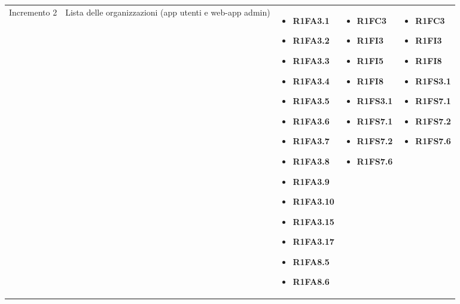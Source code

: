 {\begin{longtable}{C{2.5cm} C{3.2cm} C{2.8cm} C{2.8cm} C{2.8cm}}
Incremento 2 & Lista delle organizzazioni (app utenti e web-app admin) & \begin{itemize}
    \item[ ] \textbf{R1FA3.1}
    \item[ ] \textbf{R1FA3.2}
    \item[ ] \textbf{R1FA3.3}
    \item[ ] \textbf{R1FA3.4}
    \item[ ] \textbf{R1FA3.5}
    \item[ ] \textbf{R1FA3.6}
    \item[ ] \textbf{R1FA3.7}
    \item[ ] \textbf{R1FA3.8}
    \item[ ] \textbf{R1FA3.9}
    \item[ ] \textbf{R1FA3.10}
    \item[ ] \textbf{R1FA3.15}
    \item[ ] \textbf{R1FA3.17}
    \item[ ] \textbf{R1FA8.5}
    \item[ ] \textbf{R1FA8.6}
\end{itemize} & \begin{itemize} 
    \item[ ] \textbf{R1FC3}
    \item[ ] \textbf{R1FI3}
    \item[ ] \textbf{R1FI5}
    \item[ ] \textbf{R1FI8}
    \item[ ] \textbf{R1FS3.1}
    \item[ ] \textbf{R1FS7.1}
    \item[ ] \textbf{R1FS7.2}
    \item[ ] \textbf{R1FS7.6}
\end{itemize} & \begin{itemize} 
    \item[ ] \textbf{R1FC3}
    \item[ ] \textbf{R1FI3}
    \item[ ] \textbf{R1FI8} 
    \item[ ] \textbf{R1FS3.1}
    \item[ ] \textbf{R1FS7.1}
    \item[ ] \textbf{R1FS7.2}
    \item[ ] \textbf{R1FS7.6}
\end{itemize}\\


\end{longtable}}
